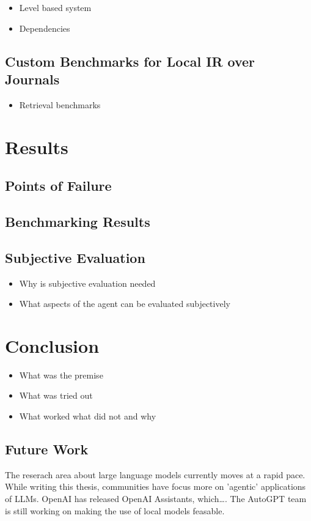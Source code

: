 \documentclass[english, version-2022-01]{uzl-thesis}
\begin{document}
\begin{itemize}
	\item Level based system
	\item Dependencies
\end{itemize}

\section{Custom Benchmarks for Local IR over Journals}

\begin{itemize}
	\item Retrieval benchmarks
\end{itemize}

\chapter{Results}

\section{Points of Failure}

\section{Benchmarking Results}

\section{Subjective Evaluation}

\begin{itemize}
	\item Why is subjective evaluation needed
	\item What aspects of the agent can be evaluated subjectively
\end{itemize}

\chapter{Conclusion}

\begin{itemize}
	\item What was the premise
	\item What was tried out
	\item What worked what did not and why
\end{itemize}

\section{Future Work}

The reserach area about large language models currently moves at a rapid pace.
While writing this thesis, communities have focus more on 'agentic' applications of LLMs.
OpenAI has released OpenAI Assistants, which\dots.
The AutoGPT team is still working on making the use of local models feasable.
\end{document}
